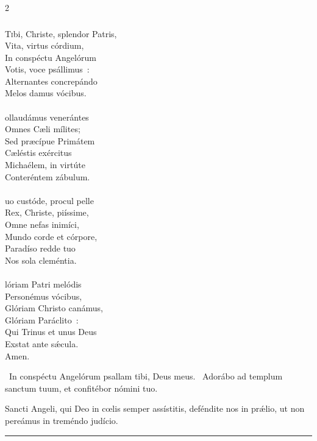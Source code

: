 \documentclass[9pt,twoside]{extarticle}
\begin{document}
\begin{multicols}{2}
{\subsubsection*{\center {}}
\lettrine{T}ibi, Christe, splendor Patris,\\
Vita, virtus córdium,\\
In conspéctu Angelórum\\
Votis, voce psállimus~:\\
Alternantes concrepándo\\
Melos damus vócibus.\\
\\
ollaudámus venerántes\\
Omnes Cæli mílites;\\
Sed præcípue Primátem\\
Cæléstis exércitus\\
Michaélem, in virtúte\\
Conteréntem zábulum.\\
\\
uo custóde, procul pelle\\
Rex, Christe, piíssime,\\
Omne nefas inimíci,\\
Mundo corde et córpore,\\
Paradíso redde tuo\\
Nos sola cleméntia.\\
\\
lóriam Patri melódis\\
Personémus vócibus,\\
Glóriam Christo canámus,\\
Glóriam Paráclito~:\\
Qui Trinus et unus Deus\\
Exstat ante sǽcula.\\
Amen.

\begin{tightlist}{}
\item {}~In conspéctu Angelórum psallam tibi, Deus meus. ~Adorábo ad templum sanctum tuum, et confitébor nómini tuo.
\item {} Sancti Angeli, qui Deo in cœlis semper assístitis, deféndite nos in prǽlio, ut non pereámus in treméndo judício.
\end{tightlist}

\begin{center}\textcolor{red}{\rule{\linewidth}{0.5pt}} \end{center}

}
\end{multicols}
\end{document}
